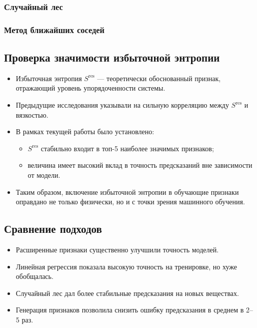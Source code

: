 \documentclass[a4paper,12pt]{article}
\begin{document}
    \subsubsection{Случайный лес}

    \subsubsection{Метод ближайших соседей}
    
  \subsection{Проверка значимости избыточной энтропии}

    \begin{itemize}
      \item Избыточная энтропия $S^{\text{res}}$ — теоретически обоснованный признак, отражающий уровень упорядоченности системы.
      \item Предыдущие исследования указывали на сильную корреляцию между $S^{\text{res}}$ и вязкостью.
      \item В рамках текущей работы было установлено:
      \begin{itemize}
        \item $S^{\text{res}}$ стабильно входит в топ-5 наиболее значимых признаков;
        \item величина имеет высокий вклад в точность предсказаний вне зависимости от модели.
      \end{itemize}
      \item Таким образом, включение избыточной энтропии в обучающие признаки оправдано не только физически, но и с точки зрения машинного обучения.
    \end{itemize}


  \subsection{Сравнение подходов}

    \begin{itemize}
      \item Расширенные признаки существенно улучшили точность моделей.
      \item Линейная регрессия показала высокую точность на тренировке, но хуже обобщалась.
      \item Случайный лес дал более стабильные предсказания на новых веществах.
      \item Генерация признаков позволила снизить ошибку предсказания в среднем в 2--5 раз.
    \end{itemize}
\end{document}
